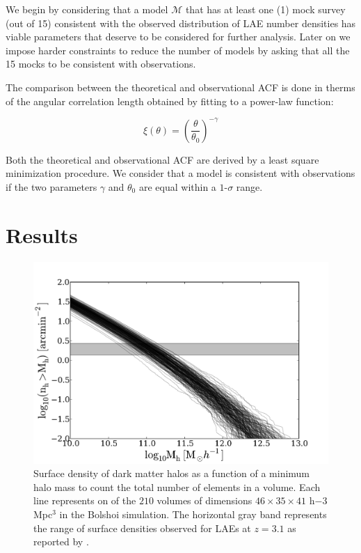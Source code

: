 \documentclass[usenatbib]{mn2e}
\begin{document}
We begin by considering that  a model ${\mathcal M}$ that has at least
one (1) mock survey (out of 15) consistent with the observed
distribution of LAE number densities has viable parameters that
deserve to be considered for further analysis. Later on we impose
harder constraints to reduce the number of models by asking that all
the 15 mocks to be consistent with observations.


The comparison between the theoretical and observational ACF is done
in therms of the angular correlation length obtained  by fitting to a power-law
function:  

\begin{equation}
\xi(\theta) = \left(\frac{\theta}{\theta_{0}}\right)^{-\gamma}
\label{eq:fitting}
\end{equation}

Both the theoretical and observational ACF are derived by a least
square minimization procedure. We consider that a model is consistent
with observations if the two parameters $\gamma$ and $\theta_0$ are
equal within a $1$-$\sigma$ range.



 
\section{Results}
\label{sec:results}

\begin{figure}
\begin{center}
\includegraphics[width=1.10\linewidth,angle=0]{./plots/Fig1.pdf}
\caption{ \label{fig:halos} Surface density of dark
  matter halos as a function of a minimum halo mass to count the
  total number of elements in a volume. Each line represents on of the
  $210$ volumes of dimensions $46\times 35\times 41$ h${-3}$Mpc$^{3}$
  in the Bolshoi simulation. The horizontal gray band represents the
  range of surface densities observed for LAEs at $z=3.1$ as reported
  by \citep{Yamada2012}.}
\end{center} 
\end{figure}
\end{document}
